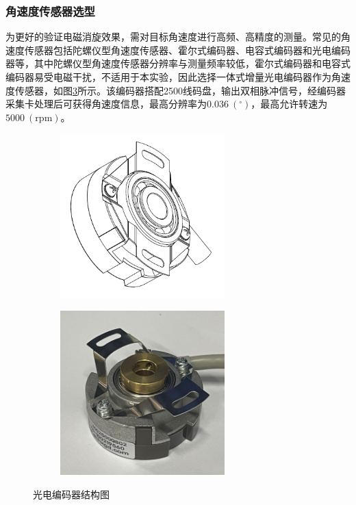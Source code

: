 \documentclass[lang=chs, degree=master, blindreview=false, winfonts=true]{yanputhesis}
\begin{document}
\subsubsection{角速度传感器选型}
为更好的验证电磁消旋效果，需对目标角速度进行高频、高精度的测量。常见的角速度传感器包括陀螺仪型角速度传感器、霍尔式编码器、电容式编码器和光电编码器等，其中陀螺仪型角速度传感器分辨率与测量频率较低，霍尔式编码器和电容式编码器易受电磁干扰，不适用于本实验，因此选择一体式增量光电编码器作为角速度传感器，如图\ref{Fig.anglecoder}所示。该编码器搭配2500线码盘，输出双相脉冲信号，经编码器采集卡处理后可获得角速度信息，最高分辨率为$0.036\ (\mathrm{^\circ})$，最高允许转速为$5000\ (\mathrm{rpm})$。
\begin{figure}[htbp]
	\centering
	\begin{minipage}[t]{0.96\textwidth}
		\begin{subfigure}[t]{0.47\textwidth}
			\centering
			\includegraphics[width = 2.5in]{picture/anglecoder.png}
			\caption{ }
			\label{fig:anglecoder}
		\end{subfigure}\hfill
		\begin{subfigure}[t]{0.47\textwidth}
			\centering
			\includegraphics[width = 2.5in]{picture/anglecoder_pic.jpg}
			\caption{ }
			\label{fig:anglecoder_pic}
		\end{subfigure}
	\end{minipage}
	\caption{光电编码器结构图\label{Fig.anglecoder}}
\end{figure}
\end{document}
